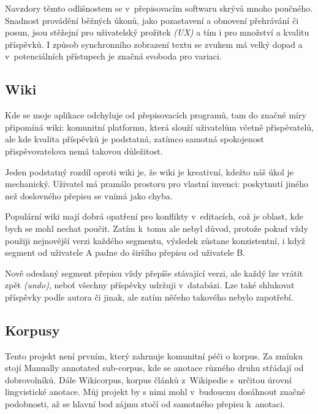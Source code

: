 \vspace{5mm}

Navzdory těmto odlišnostem se v~přepisovacím softwaru skrývá mnoho poučného.
Snadnost provádění běžných úkonů, jako pozastavení a obnovení přehrávání či
posun, jsou stěžejní pro uživatelský prožitek {\em (UX)} a tím i pro množství a kvalitu
příspěvků. I způsob synchronního zobrazení textu se zvukem má velký dopad a
v~potenciálních přístupech je značná svoboda pro variaci.

\subsection{Wiki}

Kde se moje aplikace odchyluje od přepisovacích programů, tam do značné
míry připomíná wiki: komunitní platformu, která slouží uživatelům včetně
přispěvatelů, ale kde kvalita příspěvků je podstatná, zatímco samotná
spokojenost přispěvovatelova nemá takovou důležitost.

Jeden podstatný rozdíl oproti wiki je, že wiki je kreativní, kdežto náš úkol je
mechanický. Uživatel má pramálo prostoru pro vlastní invenci: poskytnutí jiného
než doslovného přepisu se vnímá jako chyba.

Populární wiki mají dobrá opatření pro konflikty v~editacích, což je oblast, kde
bych se mohl nechat poučit. Zatím k~tomu ale nebyl důvod, protože pokud vždy
použiji nejnovější verzi každého segmentu, výsledek zůstane konzistentní, i když
segment od uživatele A padne do širšího přepisu od uživatele B.

Nově odeslaný segment přepisu vždy přepíše stávající verzi, ale každý lze
vrátit zpět {\em (undo)}, neboť všechny příspěvky udržuji v~databázi. Lze také
shlukovat příspěvky podle autora či jinak, ale zatím něčeho takového nebylo
zapotřebí.

\subsection{Korpusy}
\label{ssec:setting-corpora}

Tento projekt není prvním, který zahrnuje komunitní péči o korpus. Za zmínku
stojí Manually annotated sub-corpus\cite{ide2010manually}, kde se anotace různého
druhu střádají od dobrovolníků. Dále Wikicorpus\cite{reese2010wikicorpus},
korpus článků z~Wikipedie s~určitou úrovní lingvistické anotace. Můj projekt
by s nimi mohl v~budoucnu dosáhnout značné podobnosti, až se hlavní bod zájmu
stočí od samotného přepisu k~anotaci.

